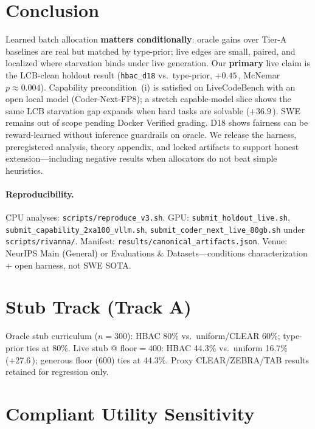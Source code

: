 \documentclass[11pt,letterpaper]{article}
\newcommand{\pp}{\,\text{pp}}
\begin{document}
\section{Conclusion}
\label{sec:conclusion}

Learned batch allocation \textbf{matters conditionally}: oracle gains over Tier-A baselines are real but matched by type-prior; live edges are small, paired, and localized where starvation binds under live generation.
Our \textbf{primary} live claim is the LCB-clean holdout result (\texttt{hbac\_d18} vs.\ type-prior, $+0.45$\pp, McNemar $p{\approx}0.004$).
Capability precondition~(i) is satisfied on LiveCodeBench with an open local model (Coder-Next-FP8); a stretch capable-model slice shows the same LCB starvation gap expands when hard tasks are solvable ($+36.9$\pp).
SWE remains out of scope pending Docker Verified grading.
D18 shows fairness can be reward-learned without inference guardrails on oracle.
We release the harness, preregistered analysis, theory appendix, and locked artifacts to support honest extension---including negative results when allocators do not beat simple heuristics.

\paragraph{Reproducibility.}
CPU analyses: \texttt{scripts/reproduce\_v3.sh}.
GPU: \texttt{submit\_holdout\_live.sh}, \texttt{submit\_capability\_2xa100\_vllm.sh}, \texttt{submit\_coder\_next\_live\_80gb.sh} under \texttt{scripts/rivanna/}.
Manifest: \texttt{results/canonical\_artifacts.json}.
Venue: NeurIPS Main (General) or Evaluations \& Datasets---conditions characterization + open harness, not SWE SOTA.




\appendix


\section{Stub Track (Track A)}
\label{app:stub}

Oracle stub curriculum ($n{=}300$): HBAC 80\% vs.\ uniform/CLEAR 60\%; type-prior ties at 80\%.
Live stub @ floor${=}400$: HBAC 44.3\% vs.\ uniform 16.7\% (+27.6\pp); generous floor (600) ties at 44.3\%.
Proxy CLEAR/ZEBRA/TAB results retained for regression only.

\section{Compliant Utility Sensitivity}
\label{app:utility}
\end{document}
